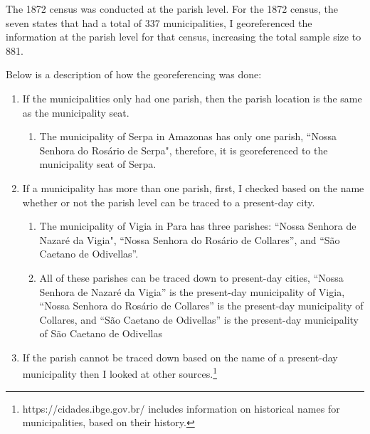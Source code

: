 \documentclass[11pt]{article}
\begin{document}
The 1872 census was conducted at the parish level. For the 1872 census, the seven states that had a total of 337 municipalities, I georeferenced the information at the parish level for that census, increasing the total sample size to 881.

Below is a description of how the georeferencing was done:

\begin{enumerate}
  \item If the municipalities only had one parish, then the parish location is the same as the municipality seat.
  \begin{enumerate}
    \item The municipality of Serpa in Amazonas has only one parish, ``Nossa Senhora do Rosário de Serpa", therefore, it is georeferenced to the municipality seat of Serpa.
  \end{enumerate}
  \item If a municipality has more than one parish, first, I checked based on the name whether or not the parish level can be traced to a present-day city.
  \begin{enumerate}
    \item The municipality of Vigia in Para has three parishes: ``Nossa Senhora de Nazaré da Vigia", ``Nossa Senhora do Rosário de Collares'', and ``São Caetano de Odivellas''. 
    \item All of these parishes can be traced down to present-day cities, ``Nossa Senhora de Nazaré da Vigia'' is the present-day municipality of Vigia, ``Nossa Senhora do Rosário de Collares'' is the present-day municipality of Collares, and ``São Caetano de Odivellas'' is the present-day municipality of São Caetano de Odivellas
  \end{enumerate}
  \item If the parish cannot be traced down based on the name of a present-day municipality then I looked at other sources.\footnote{https://cidades.ibge.gov.br/ includes information on historical names for municipalities, based on their history.}
\end{enumerate}

\clearpage

\end{document}
